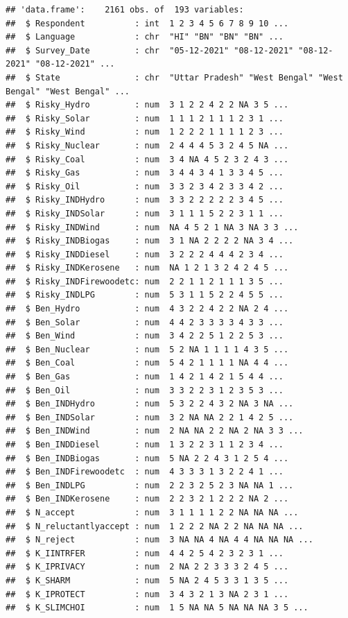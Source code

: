 \documentclass[
]{article}
\begin{document}
\begin{verbatim}
## 'data.frame':    2161 obs. of  193 variables:
##  $ Respondent          : int  1 2 3 4 5 6 7 8 9 10 ...
##  $ Language            : chr  "HI" "BN" "BN" "BN" ...
##  $ Survey_Date         : chr  "05-12-2021" "08-12-2021" "08-12-2021" "08-12-2021" ...
##  $ State               : chr  "Uttar Pradesh" "West Bengal" "West Bengal" "West Bengal" ...
##  $ Risky_Hydro         : num  3 1 2 2 4 2 2 NA 3 5 ...
##  $ Risky_Solar         : num  1 1 1 2 1 1 1 2 3 1 ...
##  $ Risky_Wind          : num  1 2 2 2 1 1 1 1 2 3 ...
##  $ Risky_Nuclear       : num  2 4 4 4 5 3 2 4 5 NA ...
##  $ Risky_Coal          : num  3 4 NA 4 5 2 3 2 4 3 ...
##  $ Risky_Gas           : num  3 4 4 3 4 1 3 3 4 5 ...
##  $ Risky_Oil           : num  3 3 2 3 4 2 3 3 4 2 ...
##  $ Risky_INDHydro      : num  3 3 2 2 2 2 2 3 4 5 ...
##  $ Risky_INDSolar      : num  3 1 1 1 5 2 2 3 1 1 ...
##  $ Risky_INDWind       : num  NA 4 5 2 1 NA 3 NA 3 3 ...
##  $ Risky_INDBiogas     : num  3 1 NA 2 2 2 2 NA 3 4 ...
##  $ Risky_INDDiesel     : num  3 2 2 2 4 4 4 2 3 4 ...
##  $ Risky_INDKerosene   : num  NA 1 2 1 3 2 4 2 4 5 ...
##  $ Risky_INDFirewoodetc: num  2 2 1 1 2 1 1 1 3 5 ...
##  $ Risky_INDLPG        : num  5 3 1 1 5 2 2 4 5 5 ...
##  $ Ben_Hydro           : num  4 3 2 2 4 2 2 NA 2 4 ...
##  $ Ben_Solar           : num  4 4 2 3 3 3 3 4 3 3 ...
##  $ Ben_Wind            : num  3 4 2 2 5 1 2 2 5 3 ...
##  $ Ben_Nuclear         : num  5 2 NA 1 1 1 1 4 3 5 ...
##  $ Ben_Coal            : num  5 4 2 1 1 1 1 NA 4 4 ...
##  $ Ben_Gas             : num  1 4 2 1 4 2 1 5 4 4 ...
##  $ Ben_Oil             : num  3 3 2 2 3 1 2 3 5 3 ...
##  $ Ben_INDHydro        : num  5 3 2 2 4 3 2 NA 3 NA ...
##  $ Ben_INDSolar        : num  3 2 NA NA 2 2 1 4 2 5 ...
##  $ Ben_INDWind         : num  2 NA NA 2 2 NA 2 NA 3 3 ...
##  $ Ben_INDDiesel       : num  1 3 2 2 3 1 1 2 3 4 ...
##  $ Ben_INDBiogas       : num  5 NA 2 2 4 3 1 2 5 4 ...
##  $ Ben_INDFirewoodetc  : num  4 3 3 3 1 3 2 2 4 1 ...
##  $ Ben_INDLPG          : num  2 2 3 2 5 2 3 NA NA 1 ...
##  $ Ben_INDKerosene     : num  2 2 3 2 1 2 2 2 NA 2 ...
##  $ N_accept            : num  3 1 1 1 1 2 2 NA NA NA ...
##  $ N_reluctantlyaccept : num  1 2 2 2 NA 2 2 NA NA NA ...
##  $ N_reject            : num  3 NA NA 4 NA 4 4 NA NA NA ...
##  $ K_IINTRFER          : num  4 4 2 5 4 2 3 2 3 1 ...
##  $ K_IPRIVACY          : num  2 NA 2 2 3 3 3 2 4 5 ...
##  $ K_SHARM             : num  5 NA 2 4 5 3 3 1 3 5 ...
##  $ K_IPROTECT          : num  3 4 3 2 1 3 NA 2 3 1 ...
##  $ K_SLIMCHOI          : num  1 5 NA NA 5 NA NA NA 3 5 ...

\end{verbatim}
\end{document}
